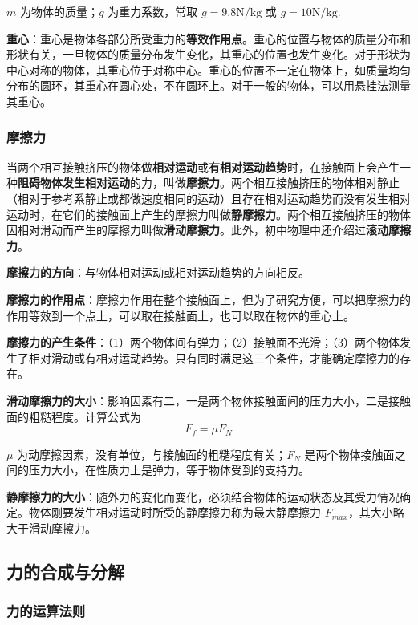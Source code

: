 $m$ 为物体的质量；$g$ 为重力系数，常取 $g=9.8\mathrm{N/kg}$ 或 $g=\mathrm{10N/kg}$.

\textbf{重心}：重心是物体各部分所受重力的\textbf{等效作用点}。重心的位置与物体的质量分布和形状有关，一旦物体的质量分布发生变化，其重心的位置也发生变化。对于形状为中心对称的物体，其重心位于对称中心。重心的位置不一定在物体上，如质量均匀分布的圆环，其重心在圆心处，不在圆环上。对于一般的物体，可以用悬挂法测量其重心。


\subsubsection{摩擦力}
当两个相互接触挤压的物体做\textbf{相对运动}或\textbf{有相对运动趋势}时，在接触面上会产生一种\textbf{阻碍物体发生相对运动}的力，叫做\textbf{摩擦力}。两个相互接触挤压的物体相对静止（相对于参考系静止或都做速度相同的运动）且存在相对运动趋势而没有发生相对运动时，在它们的接触面上产生的摩擦力叫做\textbf{静摩擦力}。两个相互接触挤压的物体因相对滑动而产生的摩擦力叫做\textbf{滑动摩擦力}。此外，初中物理中还介绍过\textbf{滚动摩擦力}。

\textbf{摩擦力的方向}：与物体相对运动或相对运动趋势的方向相反。

\textbf{摩擦力的作用点}：摩擦力作用在整个接触面上，但为了研究方便，可以把摩擦力的作用等效到一个点上，可以取在接触面上，也可以取在物体的重心上。

\textbf{摩擦力的产生条件}：（1）两个物体间有弹力；（2）接触面不光滑；（3）两个物体发生了相对滑动或有相对运动趋势。只有同时满足这三个条件，才能确定摩擦力的存在。

\textbf{滑动摩擦力的大小}：影响因素有二，一是两个物体接触面间的压力大小，二是接触面的粗糙程度。计算公式为
\begin{equation}
F_f=\mu F_N
\end{equation}

$\mu$ 为动摩擦因素，没有单位，与接触面的粗糙程度有关；$F_N$ 是两个物体接触面之间的压力大小，在性质力上是弹力，等于物体受到的支持力。

\textbf{静摩擦力的大小}：随外力的变化而变化，必须结合物体的运动状态及其受力情况确定。物体刚要发生相对运动时所受的静摩擦力称为最大静摩擦力 $F_{max}$，其大小略大于滑动摩擦力。

\subsection{力的合成与分解}
\subsubsection{力的运算法则}

